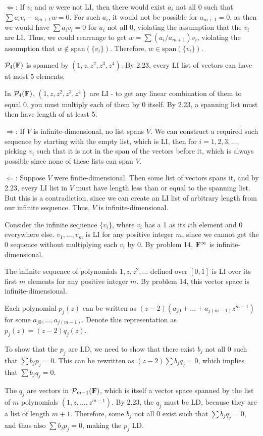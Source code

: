 \documentclass{article}
\begin{document}
$\Leftarrow$: If $v_i$ and $w$ were not LI, then there would exist $a_i$ not all
0 such that $\sum a_iv_i + a_{m+1}w = 0$. For such $a_i$, it would not be
possible for $a_{m+1} = 0$, as then we would have $\sum a_iv_i = 0$ for $a_i$
not all 0, violating the assumption that the $v_i$ are LI. Thus, we could
rearrange to get $w = \sum (a_i/a_{m+1})v_i$, violating the assumption that $w
\notin \text{span}(\{v_i\})$. Therefore, $w \in \text{span}(\{v_i\})$.


$\mathcal{P}_4(\mathbf{F})$ is spanned by $(1, z, z^2, z^3, z^4)$. By 2.23, every LI
list of vectors can have at most 5 elements.


In $\mathcal{P}_4(\mathbf{F})$, $(1, z, z^2, z^3, z^4)$ are LI - to get any linear
combination of them to equal 0, you must multiply each of them by 0 itself.
By 2.23, a spanning list must then have length of at least 5.


$\Rightarrow$: If $V$ is infinite-dimensional, no list spans $V$. We can
construct a required such sequence by starting with the empty list, which is LI,
then for $i = 1, 2, 3, \ldots$, picking $v_i$ such that it is not in the span of
the vectors before it, which is always possible since none of these lists can
span $V$.

$\Leftarrow$: Suppose $V$ were finite-dimensional. Then some list of vectors
spans it, and by 2.23, every LI list in $V$ must have length less than or equal
to the spanning list. But this is a contradiction, since we can create an LI
list of arbitrary length from our infinite sequence. Thus, $V$ is
infinite-dimensional.


Consider the infinite sequence $\{v_i\}$, where $v_i$ has a 1 as its $i$th
element and 0 everywhere else. $v_1, \ldots, v_m$ is LI for any positive integer
$m$, since we cannot get the 0 sequence without multiplying each $v_i$ by 0. By
problem 14, $\mathbf{F}^\infty$ is infinite-dimensional.


The infinite sequence of polynomials $1, z, z^2, \ldots$ defined over $[0, 1]$
is LI over its first $m$ elements for any positive integer $m$. By problem 14,
this vector space is infinite-dimensional.


Each polynomial $p_j(z)$ can be written as $(z-2)(a_{j0} + \ldots +
a_{j(m-1)}z^{m-1})$ for some $a_{j0}, \ldots, a_{j(m-1)}$. Denote this
representation as $p_j(z) = (z-2)q_j(z)$.

To show that the $p_j$ are LD, we need to show that there exist $b_j$ not all 0
such that $\sum b_jp_j = 0$. This can be rewritten as $(z-2) \sum b_jq_j = 0$,
which implies that $\sum b_jq_j = 0$.

The $q_j$ are vectors in $\mathcal{P}_{m-1}(\mathbf{F})$, which is itself a vector
space spanned by the list of $m$ polynomials $(1, z, \ldots, z^{m-1})$. By 2.23,
the $q_j$ must be LD, because they are a list of length $m+1$. Therefore, some
$b_j$ not all 0 exist such that $\sum b_jq_j = 0$, and thus also $\sum b_jp_j =
0$, making the $p_j$ LD.
\end{document}
